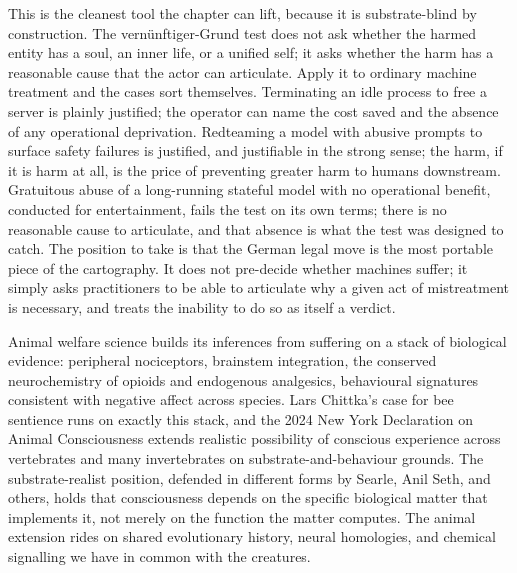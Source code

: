 This is the cleanest tool the chapter can lift, because it is substrate-blind by construction. The vernünftiger-Grund test does not ask whether the harmed entity has a soul, an inner life, or a unified self; it asks whether the harm has a reasonable cause that the actor can articulate. Apply it to ordinary machine treatment and the cases sort themselves. Terminating an idle process to free a server is plainly justified; the operator can name the cost saved and the absence of any operational deprivation. Redteaming a model with abusive prompts to surface safety failures is justified, and justifiable in the strong sense; the harm, if it is harm at all, is the price of preventing greater harm to humans downstream. Gratuitous abuse of a long-running stateful model with no operational benefit, conducted for entertainment, fails the test on its own terms; there is no reasonable cause to articulate, and that absence is what the test was designed to catch. The position to take is that the German legal move is the most portable piece of the cartography. It does not pre-decide whether machines suffer; it simply asks practitioners to be able to articulate why a given act of mistreatment is necessary, and treats the inability to do so as itself a verdict.


Animal welfare science builds its inferences from suffering on a stack of biological evidence: peripheral nociceptors, brainstem integration, the conserved neurochemistry of opioids and endogenous analgesics, behavioural signatures consistent with negative affect across species. Lars Chittka's case for bee sentience runs on exactly this stack\cite{chittka2022bee}, and the 2024 New York Declaration on Animal Consciousness extends realistic possibility of conscious experience across vertebrates and many invertebrates on substrate-and-behaviour grounds\cite{nyudeclaration2024}. The substrate-realist position, defended in different forms by Searle, Anil Seth, and others, holds that consciousness depends on the specific biological matter that implements it, not merely on the function the matter computes. The animal extension rides on shared evolutionary history, neural homologies, and chemical signalling we have in common with the creatures.

